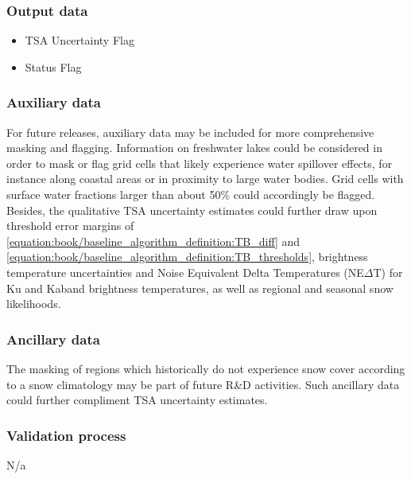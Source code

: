 \documentclass[letterpaper,10pt,english]{jupyterBook}
\begin{document}
\subsubsection{Output data}
\label{\detokenize{book/baseline_algorithm_definition:id11}}\begin{itemize}
\item {} 
\sphinxAtStartPar
TSA Uncertainty Flag

\item {} 
\sphinxAtStartPar
Status Flag

\end{itemize}


\subsubsection{Auxiliary data}
\label{\detokenize{book/baseline_algorithm_definition:auxiliary-data}}
\sphinxAtStartPar
For future releases, auxiliary data may be included for more comprehensive masking and flagging.
Information on freshwater lakes could be considered in order to mask or flag grid cells that likely experience water spill\sphinxhyphen{}over effects, for instance along coastal areas or in proximity to large water bodies.
Grid cells with surface water fractions larger than about 50\% could accordingly be flagged.
Besides, the qualitative TSA uncertainty estimates could further draw upon threshold error margins of \eqref{equation:book/baseline_algorithm_definition:TB_diff} and \eqref{equation:book/baseline_algorithm_definition:TB_thresholds}, brightness temperature uncertainties and Noise Equivalent Delta Temperatures (NE\(\Delta\)T) for Ku and Ka\sphinxhyphen{}band brightness temperatures, as well as regional and seasonal snow likelihoods.


\subsubsection{Ancillary data}
\label{\detokenize{book/baseline_algorithm_definition:ancillary-data}}
\sphinxAtStartPar
The masking of regions which historically do not experience snow cover according to a snow climatology may be part of future R\&D activities.
Such ancillary data could further compliment TSA uncertainty estimates.


\subsubsection{Validation process}
\label{\detokenize{book/baseline_algorithm_definition:validation-process}}
\sphinxAtStartPar
N/a
\end{document}
